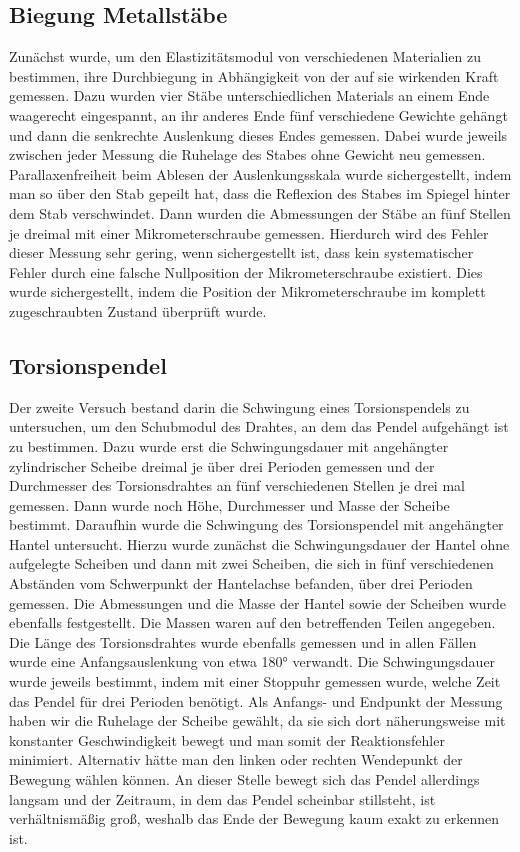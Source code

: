 \documentclass[
	a4paper,
	12pt,
	pagesize,
	ngerman
]{scrartcl}
\begin{document}
	\subsection{Biegung Metallstäbe} %
	Zunächst wurde, um den Elastizitätsmodul von verschiedenen Materialien zu bestimmen, ihre Durchbiegung in Abhängigkeit von der auf sie wirkenden Kraft gemessen. Dazu wurden vier Stäbe unterschiedlichen Materials an einem Ende waagerecht eingespannt, an ihr anderes Ende fünf verschiedene Gewichte gehängt und dann die senkrechte Auslenkung dieses Endes gemessen.
	Dabei wurde jeweils zwischen jeder Messung die Ruhelage des Stabes ohne Gewicht neu gemessen. Parallaxenfreiheit beim Ablesen der Auslenkungsskala wurde sichergestellt, indem man so über den Stab gepeilt hat, dass die Reflexion des Stabes im Spiegel hinter dem Stab verschwindet. %
	Dann wurden die Abmessungen der Stäbe an fünf Stellen je dreimal mit einer Mikrometerschraube  gemessen. Hierdurch wird des Fehler dieser Messung sehr gering, wenn sichergestellt ist, dass kein systematischer Fehler durch eine falsche Nullposition der Mikrometerschraube existiert. Dies wurde sichergestellt, indem die Position der Mikrometerschraube im komplett zugeschraubten Zustand überprüft wurde.
	
	\subsection{Torsionspendel}
	Der zweite Versuch bestand darin die Schwingung eines Torsionspendels zu untersuchen, um den Schubmodul des Drahtes, an dem das Pendel aufgehängt ist zu bestimmen. %
	 Dazu wurde erst die Schwingungsdauer mit angehängter zylindrischer Scheibe dreimal je über drei Perioden gemessen und der Durchmesser des Torsionsdrahtes an fünf verschiedenen Stellen je drei mal gemessen. Dann wurde noch Höhe, Durchmesser und Masse der Scheibe bestimmt.
	Daraufhin wurde die Schwingung des Torsionspendel mit angehängter Hantel untersucht. Hierzu wurde zunächst die Schwingungsdauer der Hantel ohne aufgelegte Scheiben und dann mit zwei Scheiben, die sich in fünf verschiedenen Abständen vom Schwerpunkt der Hantelachse befanden, über drei Perioden gemessen. Die Abmessungen und die Masse der Hantel sowie der Scheiben wurde ebenfalls festgestellt. Die Massen waren auf den betreffenden Teilen angegeben.
	Die Länge des Torsionsdrahtes wurde ebenfalls gemessen und in allen Fällen wurde eine Anfangsauslenkung von etwa 180° verwandt. Die Schwingungsdauer wurde jeweils bestimmt, indem mit einer Stoppuhr gemessen wurde, welche Zeit das Pendel für drei Perioden benötigt. Als Anfangs- und Endpunkt der Messung haben wir die Ruhelage der Scheibe gewählt, da sie sich dort näherungsweise mit konstanter Geschwindigkeit bewegt und man somit der Reaktionsfehler minimiert.
	Alternativ hätte man den linken oder rechten Wendepunkt der Bewegung wählen können. An dieser Stelle bewegt sich das Pendel allerdings langsam und der Zeitraum, in dem das Pendel scheinbar stillsteht, ist verhältnismäßig groß, weshalb das Ende der Bewegung kaum exakt zu erkennen ist.
	
\end{document}

